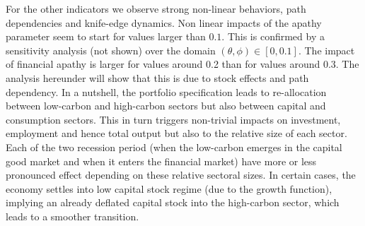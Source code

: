 \documentclass[authoryear]{article}
\begin{document}
For the other indicators we observe strong non-linear behaviors, path dependencies and knife-edge dynamics. Non linear impacts of the apathy parameter seem to start for values larger than \(0.1\). This is confirmed by a sensitivity analysis (not shown) over the domain \((\theta,\phi)\in [0,0.1]\). The impact of financial apathy is larger for values around 0.2 than for values around 0.3. The analysis hereunder will show that this is due to stock effects and path dependency. In a nutshell, the portfolio specification leads to re-allocation between low-carbon and high-carbon sectors but also between capital and consumption sectors. This in turn triggers non-trivial impacts on investment, employment and hence total output but also to the relative size of each sector. Each of the two recession period (when the low-carbon emerges in the capital good market and when it enters the financial market) have more or less pronounced effect depending on these relative sectoral sizes. In certain cases, the economy settles into low capital stock regime (due to the growth function), implying an already deflated capital stock into the high-carbon sector, which leads to a smoother transition.

\end{document}
